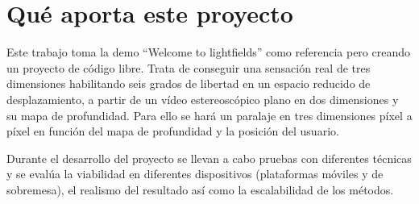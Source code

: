 \section{Qué aporta este proyecto}
Este trabajo toma la demo ``Welcome to lightfields'' como referencia pero creando un proyecto de código libre. Trata de conseguir una sensación real de tres dimensiones habilitando seis grados de libertad en un espacio reducido de desplazamiento, a partir de un vídeo estereoscópico plano en dos dimensiones y su mapa de profundidad. Para ello se hará un paralaje en tres dimensiones píxel a píxel en función del mapa de profundidad y la posición del usuario.

Durante el desarrollo del proyecto se llevan a cabo pruebas con diferentes técnicas y se evalúa la viabilidad en diferentes dispositivos (plataformas móviles y de sobremesa), el realismo del resultado así como la escalabilidad de los métodos.
















